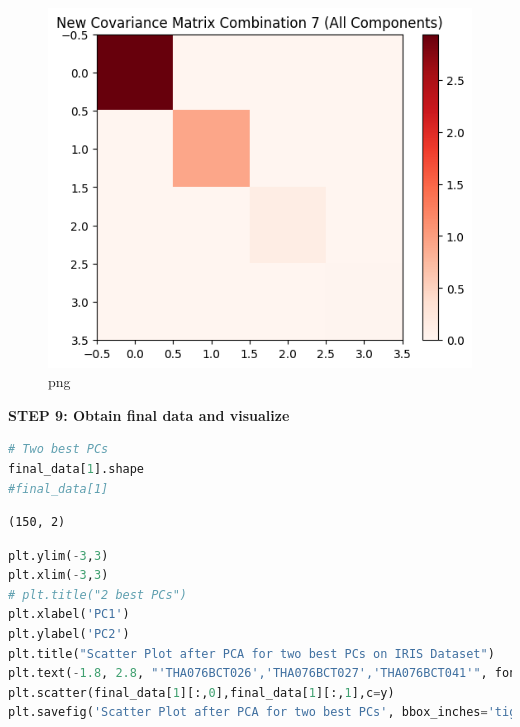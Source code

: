 \documentclass[
]{article}
\begin{document}
\begin{figure}
\centering
\includegraphics{PCA on IRIS_files/PCA on IRIS_45_0.png}
\caption{png}
\end{figure}

\textbf{STEP 9: Obtain final data and visualize}

\begin{lstlisting}[language=Python]
# Two best PCs
final_data[1].shape
#final_data[1]
\end{lstlisting}

\begin{lstlisting}
(150, 2)
\end{lstlisting}

\begin{lstlisting}[language=Python]
plt.ylim(-3,3)
plt.xlim(-3,3)
# plt.title("2 best PCs")
plt.xlabel('PC1')
plt.ylabel('PC2')
plt.title("Scatter Plot after PCA for two best PCs on IRIS Dataset")
plt.text(-1.8, 2.8, "'THA076BCT026','THA076BCT027','THA076BCT041'", fontsize=8,color='red')
plt.scatter(final_data[1][:,0],final_data[1][:,1],c=y)
plt.savefig('Scatter Plot after PCA for two best PCs', bbox_inches='tight')
\end{lstlisting}
\end{document}

